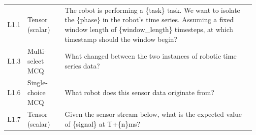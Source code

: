 \begin{small}
\begin{longtable}{@{}>{\centering\arraybackslash}p{}>{\raggedright\arraybackslash}p{}>{\raggedright\arraybackslash}p{}@{}}
        \multicolumn{3}{@{}l@{}}{\textbf{Level 1: State}}                                                                                                                                                                                                                                                                                                                                                                                                                                                                                         \\
        \midrule
        L1.1        & Tensor (scalar)        & The robot is performing a \{task\} task. We want to isolate the \{phase\} in the robot's time series. Assuming a fixed window length of \{window\_length\} timesteps, at which timestamp should the window begin?                                                                                                                                                                                                                                                                                  \\
        L1.3        & Multi-select MCQ       & What changed between the two instances of robotic time series data?                                                                                                                                                                                                                                                                                                                                                                                                                                \\
        L1.6        & Single-choice MCQ      & What robot does this sensor data originate from?                                                                                                                                                                                                                                                                                                                                                                                                                                                   \\
        L1.7        & Tensor (scalar)        & Given the sensor stream below, what is the expected value of \{signal\} at T+\{n\}ms?                                                                                                                                                                                                                                                                                                                                                                                                              \\
        \midrule


\end{longtable}
\end{small}
